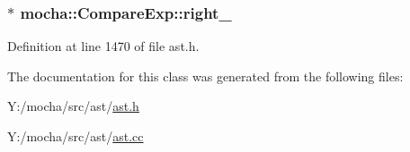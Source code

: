 \hypertarget{classmocha_1_1_compare_exp_a75ad5e6ec8152bd2391044bda81b8948}{
\subsubsection[{right\_\-}]{$\ast$ {\bf mocha::CompareExp::right\_\-}}}
\label{classmocha_1_1_compare_exp_a75ad5e6ec8152bd2391044bda81b8948}


Definition at line 1470 of file ast.h.



The documentation for this class was generated from the following files:\begin{DoxyCompactItemize}
\item 
Y:/mocha/src/ast/\hyperlink{ast_8h}{ast.h}\item 
Y:/mocha/src/ast/\hyperlink{ast_8cc}{ast.cc}\end{DoxyCompactItemize}
